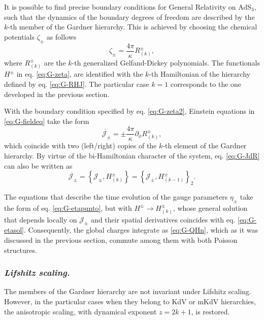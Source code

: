\documentclass[letterpaper,11pt,oneside]{book}
\begin{document}
It is possible to find precise boundary conditions for General Relativity
on AdS$_{3}$, such that the dynamics of the boundary degrees of freedom
are described by the $k$-th member of the Gardner hierarchy. This
is achieved by choosing the chemical potentials $\zeta_{\pm}$ as
follows 
\begin{equation}
	\zeta_{\pm}=\frac{4\pi}{\kappa}R_{\left(k\right)}^{\pm},\label{eq:G-zeta2}
\end{equation}
where $R_{\left(k\right)}^{\pm}$ are the $k$-th generalized Gelfand-Dickey
polynomials. The functionals $H^{\pm}$ in eq. \eqref{eq:G-zeta},
are identified with the $k$-th Hamiltonian of the hierarchy defined
by eq. \eqref{eq:G-RHJ}. The particular case $k=1$ corresponds to
the one developed in the previous section.

With the boundary condition specified by eq. \eqref{eq:G-zeta2},
Einstein equations in \eqref{eq:G-fieldeq} take the form 
\begin{equation}
	\dot{\mathcal{J}_{\pm}}=\pm\frac{4\pi}{\kappa}\partial_{\phi}R_{\left(k\right)}^{\pm},\label{eq:G-JdR}
\end{equation}
which coincide with two (left/right) copies of the $k$-th element
of the Gardner hierarchy. By virtue of the bi-Hamiltonian character
of the system, eq. \eqref{eq:G-JdR} can also be written as
\begin{equation}
	\dot{\mathcal{J}_{\pm}}=\left\{ \mathcal{J_{\pm}},H_{\left(k\right)}^{\pm}\right\} =\left\{ \mathcal{J_{\pm}},H_{\left(k-1\right)}^{\pm}\right\} _{2}.\label{eq:G-jpuntobracket}
\end{equation}

The equations that describe the time evolution of the gauge parameters
$\eta_{\pm}$ take the form of eq. \eqref{eq:G-etapunto}, but with
$H^{\pm}\rightarrow H_{\left(k\right)}^{\pm}$, whose general solution
that depends locally on $\mathcal{J_{\pm}}$ and their spatial derivatives
coincides with eq. \eqref{eq:G-etasol}. Consequently, the global
charges integrate as \eqref{eq:G-QHn}, which as it was discussed
in the previous section, commute among them with both Poisson structures.

\subsubsection*{\emph{Lifshitz scaling.}}

The members of the Gardner hierarchy are not invariant under Lifshitz
scaling. However, in the particular cases when they belong to KdV
or mKdV hierarchies, the anisotropic scaling, with dynamical exponent
$z=2k+1$, is restored.
\end{document}

